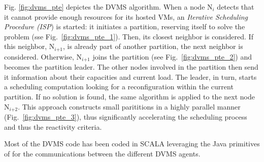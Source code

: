 Fig. \ref{fig:dvms_pte} depictes the DVMS algorithm.
When a node N\(_{\textit{i}}\) detects that it cannot provide enough
resources for its hosted VMs, %
an \emph{Iterative Scheduling Procedure
  (ISP}) is started:
%
it initiates a partition, reserving itself to solve the problem (sse
Fig.~\ref{fig:dvms_pte_1}).
Then, its
closest neighbor %
is considered.
%
If this neighbor, N\(_{\textit{i+1}}\),
is already part of another partition, the next neighbor is considered.
Otherwise, N\(_{\textit{i+1}}\)
joins the partition (see Fig.~\ref{fig:dvms_pte_2}) and becomes the
partition leader.
%
The other nodes involved in the partition then send it information about their
capacities and current load. The leader, in turn, starts a scheduling
computation looking for a reconfiguration within the current
partition. If no solution is found, the same algorithm is applied to
the next node N\(_{\textit{i+2}}\).
%
This approach constructs small parititions in a highly parallel
manner (Fig.~\ref{fig:dvms_pte_3}), thus significantly accelerating
the scheduling process and thus the reactivity criteria.

Most of the DVMS code has been coded in SCALA leveraging the Java
primitives of \sg for the communications between the different DVMS agents.



